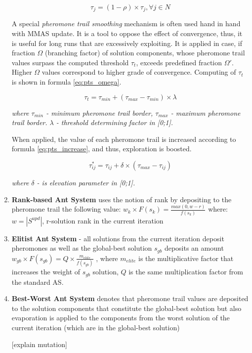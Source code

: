 \documentclass[11pt,a4paper,oneside]{book}
\begin{document}
\begin{enumerate}
\begin{equation}
\tau_j = (1-\rho) \times \tau_j, \forall j \in N
\label{eq:mmas_evaporation}
\end{equation}

A special \textit{pheromone trail smoothing} mechanism is often used hand in hand with MMAS update. It is a tool to oppose the effect of convergence, thus, it is useful for long runs that are excessively exploiting. It is applied in case, if fraction $\Omega$ (branching factor) of solution components, whose pheromone trail values surpass the computed threshold $\tau_t$, exceeds predefined fraction $\Omega'$. Higher $\Omega$ values correspond to higher grade of convergence. Computing of $\tau_t$ is shown in formula \ref{eq:pts_omega}.

\begin{equation}
\tau_t = \tau_{min} + (\tau_{max} - \tau_{min}) \times \lambda
\label{eq:pts_omega}
\end{equation}

\textit{where $\tau_{min}$ - minimum pheromone trail border, $\tau_{max}$ - maximum pheromone trail border.  $\lambda$ - threshold determining factor in [0;1].}

When applied, the value of each pheromone trail is increased according to formula \ref{eq:pts_increase}, and thus, exploration is boosted.

\begin{equation}
\tau^*_{ij} = \tau_{ij} + \delta \times (\tau_{max} - \tau_{ij})
\label{eq:pts_increase}
\end{equation}

\textit{where $\delta$ - is elevation parameter in [0;1].}



\item {\textbf{Rank-based Ant System} uses the notion of rank by depositing \cite{ras} to the pheromone trail the following value:
$w_k \times F(s_k) = \frac{max(0,w-r)}{f(s_k)}$
where: $w=|S^{upd}|$, r-solution rank in the current iteration
}

\item {\textbf{Elitist Ant System} - all solutions from the current iteration deposit pheromones as well as the global-best solution $s_{gb}$ deposits an amount $w_{gb} \times F(s_{gb}) = Q \times \frac{m_{elite}}{f(s_{gb})}$ \cite{eas}, where $m_{elite}$ is the multiplicative factor that increases the weight of $s_{gb}$ solution, $Q$ is the same multiplication factor from the standard AS.}

\item \textbf{Best-Worst Ant System} denotes that pheromone trail values are deposited to the solution components that constitute the global-best solution but also evaporation is applied to the components from the worst solution of the current iteration (which are in the global-best solution) \cite{bwas}

[explain mutation]

\end{enumerate}
\end{document}

